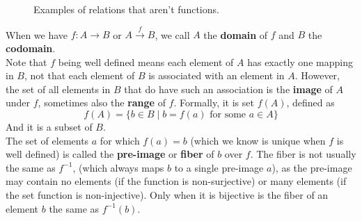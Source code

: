 \documentclass[12pt]{article}
\begin{document}
    \begin{figure}[H]
        \centering


        \caption{
            \label{fig:figure1} Examples of relations 
            that aren't functions.
        }
    \end{figure}
  
    When we have $f: A \rightarrow B$
    or $A \stackrel{f}{\rightarrow} B$,
    we call $A$ the \textbf{domain} of $f$
    and $B$ the \textbf{codomain}. \\
    Note that $f$ being well defined means each element of $A$
    has exactly one mapping in $B$, not that each element of $B$
    is associated with an element in $A$.
    However, the set of all elements in $B$ that do have
    such an association
    is the \textbf{image} of $A$ under $f$,
    sometimes also the \textbf{range} of $f$.
    Formally, it is set $f(A)$, defined as
    \[ f(A) = \{ b \in B \mid b = f(a) \text{ for some } a \in A \} \]
    And it is a subset of $B$. \\
    The set of elements $a$ for which $f(a) = b$
    (which we know is unique when $f$ is well defined)
    is called the \textbf{pre-image} or \textbf{fiber} of $b$ over $f$.
    The fiber is not usually the same as $f^{-1}$,
    (which always maps $b$ to a single pre-image $a$),
    as the pre-image may contain no elements
    (if the function is non-surjective)
    or many elements
    (if the set function is non-injective).
    Only when it is bijective is the fiber of an element $b$
    the same as $f^{-1}(b)$. \\
\end{document}
